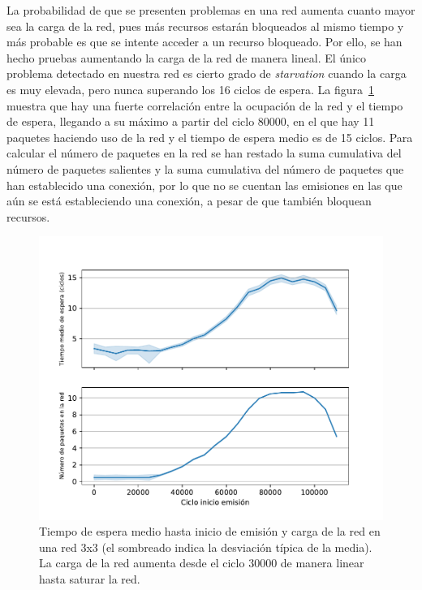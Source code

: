 La probabilidad de que se presenten problemas en una red aumenta cuanto mayor sea la carga de la red, pues más recursos estarán bloqueados al mismo tiempo y más probable es que se intente acceder a un recurso bloqueado. Por ello, se han hecho pruebas aumentando la carga de la red de manera lineal. El único problema detectado en nuestra red es cierto grado de \textit{starvation} cuando la carga es muy elevada, pero nunca superando los 16 ciclos de espera. La figura~\ref{fig:starvationWait} muestra que hay una fuerte correlación entre la ocupación de la red y el tiempo de espera, llegando a su máximo a partir del ciclo 80000, en el que hay 11 paquetes haciendo uso de la red y el tiempo de espera medio es de 15 ciclos. Para calcular el número de paquetes en la red se han restado la suma cumulativa del número de paquetes salientes y la suma cumulativa del número de paquetes que han establecido una conexión, por lo que no se cuentan las emisiones en las que aún se está estableciendo una conexión, a pesar de que también bloquean recursos.

\begin{figure}[h]
    \centering
    \includegraphics[width=.9\linewidth]{images/plots/wait_packets.pdf}
    \caption[Tiempo de espera hasta inicio de emisión y carga de la red.]{Tiempo de espera medio hasta inicio de emisión y carga de la red en una red 3x3 (el sombreado indica la desviación típica de la media). La carga de la red aumenta desde el ciclo 30000 de manera linear hasta saturar la red.}
    \label{fig:starvationWait}
\end{figure}


